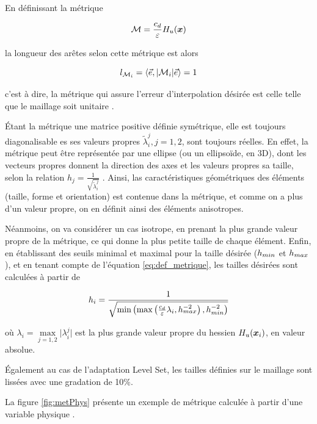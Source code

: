 \indent En définissant la métrique

\begin{equation}
	\label{eq:def_metrique}
	\mathcal{M} = \frac{c_d}{\varepsilon}H_u(\boldsymbol{x})
\end{equation}

\noindent la longueur des arêtes selon cette métrique est alors

\begin{equation*}
	l_{\mathcal{M}_i} = \langle \vec{e}, |\mathcal{M}_i| \vec{e} \rangle = 1
\end{equation*}

\noindent c'est à dire, la métrique qui assure l'erreur d'interpolation désirée est celle telle que le maillage soit unitaire \cite{cecile_these,frey_alauzet}.

\indent Étant la métrique une matrice positive définie symétrique, elle est toujours diagonalisable es ses valeurs propres \(\tilde{\lambda}_i^j, j=1,2\), sont toujours réelles. En effet, la métrique peut être représentée par une ellipse (ou un ellipsoïde, en 3D), dont les vecteurs propres donnent la direction des axes et les valeurs propres sa taille, selon la relation \(h_j =  \frac{1}{\sqrt{\tilde{\lambda}_i^j}}\) \cite{leo}. Ainsi, las caractéristiques géométriques des éléments (taille, forme et orientation) est contenue dans la métrique, et comme on a plus d'un valeur propre, on en définit ainsi des éléments anisotropes.

\indent Néanmoins, on va considérer un cas isotrope, en prenant la plus grande valeur propre de la métrique, ce qui donne la plus petite taille de chaque élément. Enfin, en établissant des seuils minimal et maximal pour la taille désirée (\(h_{min}\) et \(h_{max}\)), et en tenant compte de l'équation \eqref{eq:def_metrique}, les tailles désirées sont calculées à partir de

\begin{equation*}
	h_i = \frac{1}{\sqrt{\min\left(\max\left(\frac{c_d}{\varepsilon}\lambda_i,h_{max}^{-2}\right),h_{min}^{-2}\right)}}
\end{equation*}

\noindent où \(\lambda_i = \max\limits_{j=1,2}{|\lambda_i^j}|\) est la plus grande valeur propre du hessien \(H_u(\boldsymbol{x}_i) \), en valeur absolue.

\indent Également au cas de l'adaptation Level Set, les tailles définies sur le maillage sont lissées avec une gradation de 10\%.

\indent La figure \ref{fig:metPhys} présente un exemple de métrique calculée à partir d'une variable physique .


